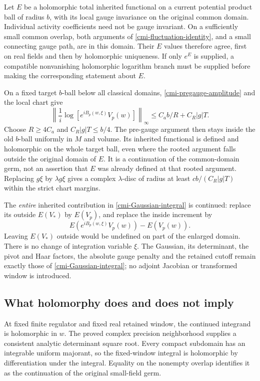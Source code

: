 \documentclass[11pt]{article}
\theoremstyle{remark}
\begin{document}
Let $E$ be a holomorphic total inherited functional on a
current potential product ball of radius $b$, with its
local gauge invariance on the original common domain.
Individual activity coefficients need not be gauge invariant.
On a sufficiently small common overlap, both arguments of
\eqref{cmi-fluctuation-identity}, and a small connecting
gauge path, are in this domain. Their $E$ values therefore
agree, first on real fields and then by holomorphic uniqueness.
If only $e^E$ is supplied, a compatible nonvanishing
holomorphic logarithm branch must be supplied before making
the corresponding statement about $E$.

On a fixed target $b$-ball below all classical domains,
\eqref{cmi-pregauge-amplitude} and the local chart give
\begin{equation}\label{cmi-common-ball}
 \left\|\frac1i\log[e^{iB_p(w,\xi)}V_p(w)]\right\|_\infty
       \le C_a b/R+C_R|g|T.
\end{equation}
Choose $R\ge4C_a$ and $C_R|g|T\le b/4$.
The pre-gauge argument then stays inside the old $b$-ball
uniformly in $M$ and volume. Its inherited functional is
defined and holomorphic on the whole target ball, even
where the rooted argument falls outside the original
domain of $E$. It is a continuation of the common-domain
germ, not an assertion that $E$ was already defined at
that rooted argument. Replacing $g\xi$ by $\lambda g\xi$
gives a complex $\lambda$-disc of radius at least
$cb/(C_R|g|T)$ within the strict chart margins.

The \emph{entire} inherited contribution in
\eqref{cmi-Gaussian-integral} is continued: replace its
outside $E(V_*)$ by $E(V_p)$, and replace the inside
increment by
\[
 E(e^{iB_p(w,\xi)}V_p(w))-E(V_p(w)).
\]
Leaving $E(V_*)$ outside would be undefined on part of
the enlarged domain. There is no change of integration
variable $\xi$. The Gaussian, its determinant, the pivot
and Haar factors, the absolute gauge penalty and the
retained cutoff remain exactly those of
\eqref{cmi-Gaussian-integral}; no adjoint Jacobian or
transformed window is introduced.

\subsection{What holomorphy does and does not imply}
\label{cmi-scope-section}

At fixed finite regulator and fixed real retained window,
the continued integrand is holomorphic in $w$. The proved
complex precision neighborhood supplies a consistent
analytic determinant square root. Every compact subdomain
has an integrable uniform majorant, so the fixed-window
integral is holomorphic by differentiation under the
integral. Equality on the nonempty overlap identifies it
as the continuation of the original small-field germ.
\end{document}
